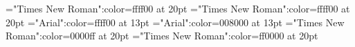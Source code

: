 \font\tdta="Times New Roman":color=ffff00 at 20pt
\font\tdtbta="Times New Roman":color=ffff00 at 20pt
\font\tdtctbta="Arial":color=ffff00 at 13pt
\font\tctbta="Arial":color=008000 at 13pt
\font\tbta="Times New Roman":color=0000ff at 20pt
\font\ta="Times New Roman":color=ff0000 at 20pt









\bye
